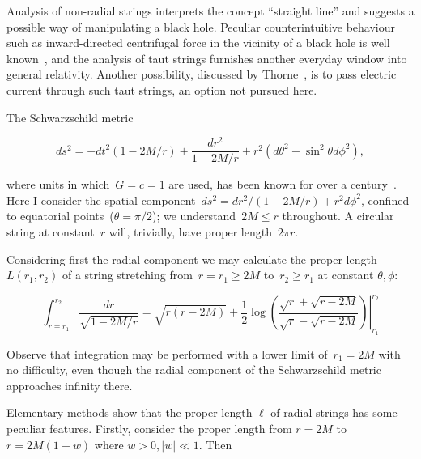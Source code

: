 Analysis of non-radial strings interprets the concept ``straight
line'' and suggests a possible way of manipulating a black hole.
Peculiar counterintuitive behaviour such as inward-directed
centrifugal force in the vicinity of a black hole is well
known~\cite{abramowicz1992,abramowicz1993}, and the analysis of taut
strings furnishes another everyday window into general relativity.
Another possibility, discussed by Thorne~\cite{thorne1986}, is to pass
electric current through such taut strings, an option not pursued
here.

The Schwarzschild metric

\begin{equation}\label{schwarzschild}
ds^2= -dt^2\left(1-2M/r\right) +\frac{dr^2}{1-2M/r} + r^2\left(d\theta^2 + \sin^2\theta d\phi^2\right),
\end{equation}

\noindent where units in which~$G=c=1$ are used, has been known for
over a century~\cite{schwarzschild1916}.  Here I consider the spatial
component~$ds^2= dr^2/\left(1-2M/r\right) + r^2d\phi^2$, confined to
equatorial points~($\theta=\pi/2$); we understand~$2M\leq r$
throughout.  A circular string at constant~$r$ will, trivially, have
proper length~$2\pi r$.

Considering first the radial component we may calculate the
proper length $L\left(r_1,r_2\right)$ of a string stretching
from~$r=r_1\geq 2M$ to~$r_2\geq r_1$ at constant $\theta,\phi$:


\begin{equation}\label{radial_string_length}
  \int_{r=r_1}^{r_2}\frac{dr}{\sqrt{1-2M/r}}=
  \left.
  \sqrt{r(r-2M)} +\frac{1}{2}\log\left(
  \frac{\sqrt{r}+\sqrt{r-2M}}{\sqrt{r}-\sqrt{r-2M}}\right)
  \right|_{r_1}^{r_2}
  \end{equation}

Observe that integration may be performed with a lower limit
of~$r_1=2M$ with no difficulty, even though the radial component of the
Schwarzschild metric approaches infinity there.

Elementary methods show that the proper length $\ell$ of radial strings has
some peculiar features.  Firstly, consider the proper length from
$r=2M$ to $r=2M(1+w)$ where $w>0, \left|w\right|\ll 1$.  Then

